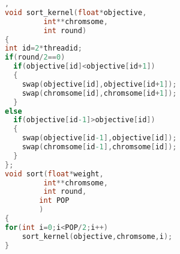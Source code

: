 \documentclass{article}
\begin{document}
 
\begin{lstlisting}[language=C],
void sort_kernel(float*objective,
	     int**chromsome,
	     int round)
{
int id=2*threadid;
if(round/2==0)
  if(objective[id]<objective[id+1])
  {
	swap(objective[id],objective[id+1]);
	swap(chromsome[id],chromsome[id+1]);
  }
else
  if(objective[id-1]>objective[id])
  {
	swap(objective[id-1],objective[id]);
	swap(chromsome[id-1],chromsome[id]);
  }
};
void sort(float*weight,
	     int**chromsome,
	     int round,
		int POP
		)
{
for(int i=0;i<POP/2;i++)
    sort_kernel(objective,chromsome,i);
}
\end{lstlisting}
\end{document}
